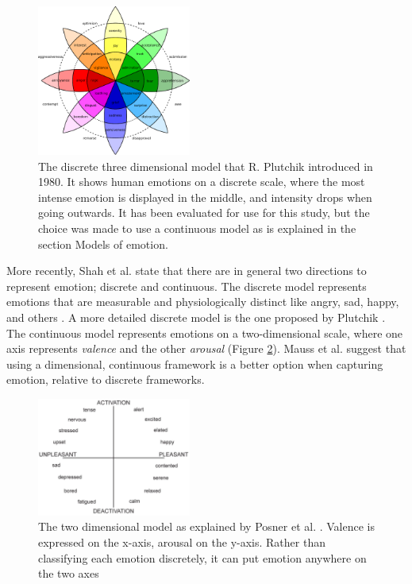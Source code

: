 \documentclass{sigchi}
\begin{document}
\begin{figure}[t]
    \centering
    \includegraphics[width=0.45\textwidth]{images/PlutchikWheelOfEmotions.eps}
    \caption{The discrete three dimensional model that R. Plutchik \protect\cite{Plutchik1980} introduced in 1980. It shows human emotions on a discrete scale, where the most intense emotion is displayed in the middle, and intensity drops when going outwards. It has been evaluated for use for this study, but the choice was made to use a continuous model as is explained in the section Models of emotion.}
    \label{fig:wheel_of_emotions}
\end{figure}

More recently, Shah et al. \cite{Shah2015} state that there are in general two directions to represent emotion; discrete and continuous. The discrete model represents emotions that are measurable and physiologically distinct like angry, sad, happy, and others \cite{Ekman1992}. A more detailed discrete model is the one proposed by Plutchik \cite{Plutchik1980}. The continuous model represents emotions on a two-dimensional scale, where one axis represents \textit{valence} and the other \textit{arousal} \cite{Posner2005} (Figure \ref{fig:circumplex_model}). Mauss et al. \cite{Mauss2009} suggest that using a dimensional, continuous framework is a better option when capturing emotion, relative to discrete frameworks. 

\begin{figure}[t]
    \centering
    \includegraphics[width=0.45\textwidth]{images/CircumplexModel.jpg}
    \caption{The two dimensional model as explained by Posner et al. \protect\cite{Posner2005}. Valence is expressed on the x-axis, arousal on the y-axis. Rather than classifying each emotion discretely, it can put emotion anywhere on the two axes}
    \label{fig:circumplex_model}
\end{figure}
\end{document}
